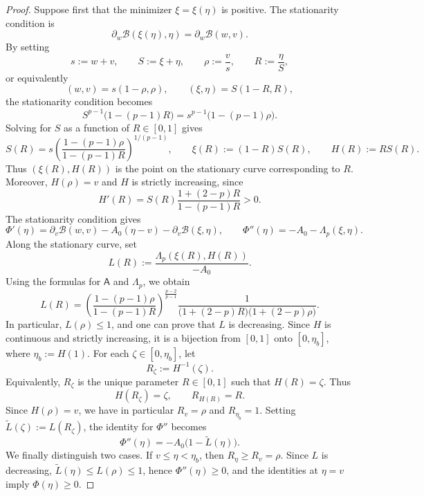 \documentclass[10pt,a4paper]{amsart}
\begin{document}
\begin{proof}
Suppose first that the minimizer $\xi=\xi(\eta)$ is positive. The
stationarity condition is
\[
\partial_w\mathcal B(\xi(\eta),\eta)=\partial_w\mathcal B(w,v).
\]
By setting
\[
s:=w+v,
\qquad S:=\xi+\eta,
\qquad \rho:=\frac vs,
\qquad R:=\frac\eta S,
\]
or equivalently
\[
(w,v)=s(1-\rho,\rho),
\qquad (\xi,\eta)=S(1-R,R),
\]
the stationarity condition becomes
\[
S^{p-1}\bigl(1-(p-1)R\bigr)
=s^{p-1}\bigl(1-(p-1)\rho\bigr).
\]
Solving for $S$ as a function of $R\in[0,1]$ gives
\[
S(R)
=s\left(\frac{1-(p-1)\rho}{1-(p-1)R}\right)^{1/(p-1)},
\qquad \xi(R):=(1-R)S(R),
\qquad H(R):=RS(R).
\]
Thus $(\xi(R),H(R))$ is the point on the stationary curve corresponding
to $R$.
Moreover, $H(\rho)=v$ and $H$ is strictly increasing, since
\[
H'(R)=S(R)\frac{1+(2-p)R}{1-(p-1)R}>0.
\]
The stationarity condition gives
\[
\Phi'(\eta)
=\partial_v\mathcal B(w,v)-A_0(\eta-v)-\partial_v\mathcal B(\xi,\eta),
\qquad
\Phi''(\eta)=-A_0-\Lambda_p(\xi,\eta).
\]
Along the stationary curve, set
\[
L(R):=\frac{\Lambda_p(\xi(R),H(R))}{-A_0}.
\]
Using the formulas for $\mathsf A$ and $\Lambda_p$, we obtain
\[
L(R)
=\left(\frac{1-(p-1)\rho}{1-(p-1)R}\right)^{\frac{p-2}{p-1}}
\frac1{\bigl(1+(2-p)R\bigr)\bigl(1+(2-p)\rho\bigr)}.
\]
In particular, $L(\rho)\leq1$, and one can prove that $L$ is decreasing.
Since $H$ is continuous and strictly increasing, it is a bijection from
$[0,1]$ onto $[0,\eta_b]$, where $\eta_b:=H(1)$.
For each $\zeta\in[0,\eta_b]$, let
\[
R_\zeta:=H^{-1}(\zeta).
\]
Equivalently, $R_\zeta$ is the unique parameter $R\in[0,1]$ such that
$H(R)=\zeta$. Thus
\[
H(R_\zeta)=\zeta,
\qquad R_{H(R)}=R.
\]
Since $H(\rho)=v$, we have in particular $R_v=\rho$ and $R_{\eta_b}=1$.
Setting $\widetilde L(\zeta):=L(R_\zeta)$, the identity for $\Phi''$ becomes
\[
\Phi''(\eta)=-A_0\bigl(1-\widetilde L(\eta)\bigr).
\]
We finally distinguish two cases.
If $v\leq\eta<\eta_b$, then $R_\eta\geq R_v=\rho$.
Since $L$ is decreasing, $\widetilde L(\eta)\leq L(\rho)\leq1$,
hence $\Phi''(\eta)\geq0$, and the identities at $\eta=v$ imply
$\Phi(\eta)\geq0$.


\end{proof}
\end{document}
